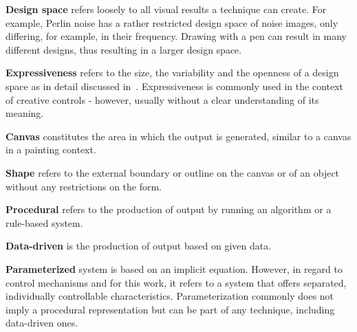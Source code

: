 \textbf{Design space} refers loosely to all visual results a technique can create. For example, Perlin noise has a rather restricted design space of noise images, only differing, for example, in their frequency. Drawing with a pen can result in many different designs, thus resulting in a larger design space.

\textbf{Expressiveness} refers to the size, the variability and the openness of a design space as in detail discussed in~. Expressiveness is commonly used in the context of creative controls - however, usually without a clear understanding of its meaning.


\textbf{Canvas} constitutes the area in which the output is generated, similar to a canvas in a painting context.




\textbf{Shape} refers to the external boundary or outline on the canvas or of an object without any restrictions on the form. 


\textbf{Procedural} refers to the production of output by running an algorithm or a rule-based system.

\textbf{Data-driven} is the production of output based on given data.

\textbf{Parameterized} system is based on an implicit equation. However, in regard to control mechanisms and for this work, it refers to a system that offers separated, individually controllable characteristics. Parameterization commonly does not imply a procedural representation but can be part of any technique, including data-driven ones.
